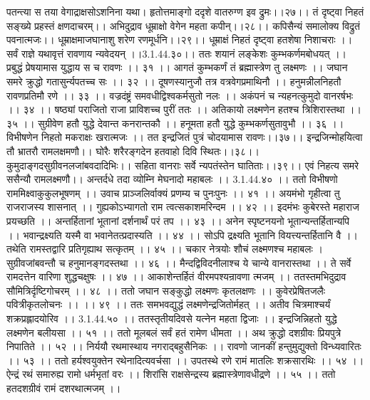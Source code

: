 पतन्त्या स तया वेगाद्राक्षसोऽशनिना यथा।
हृतोत्तमाङ्गो ददृशे वातरुग्ण इव द्रुमः।।२७।।
तं दृष्ट्वा निहतं सङ्ख्ये प्रहस्तं क्षणदाचरम्।।
अभिदुद्राव धूम्राक्षो वेगेन महता कपीन्।।२८।।
कपिसैन्यं समालोक्य विद्रुतं पवनात्मजः।।
धूम्राक्षमाजघानाशु शरेण रणमूर्धनि।।२९।।
धूम्राक्षं निहतं दृष्ट्वा हतशेषा निशाचराः ।।
सर्वं राज्ञे यथावृत्तं रावणाय न्यवेदयन् ।।3.1.44.३०।।
ततः शयानं लङ्केशः कुम्भकर्णमबोधयत् ।।
प्रबुद्धं प्रेषयामास युद्धाय स च रावणः ।। ३१ ।।
आगतं कुम्भकर्णं तं ब्रह्मास्त्रेण तु लक्ष्मणः ।।
जघान समरे क्रुद्धो गतासुर्न्यपतच्च सः ।। ३२ ।।
दूषणस्यानुजौ तत्र वत्रवेगप्रमाथिनौ ।।
हनुमन्नीलनिहतौ रावणप्रतिमौ रणे ।। ३३ ।।
वज्रदंष्ट्रं समवधीद्विश्वकर्मसुतो नलः ।।
अकंपनं च न्यहनत्कुमुदो वानरर्षभः ।। ३४ ।।
षष्ठ्यां पराजितो राजा प्राविशच्च पुरीं ततः ।।
अतिकायो लक्ष्मणेन हतश्च त्रिशिरास्तथा ।। ३५ ।।
सुग्रीवेण हतौ युद्धे देवान्त कनरान्तकौ ।।
हनूमता हतौ युद्धे कुम्भकर्णसुतावुभौ ।। ३६ ।।
विभीषणेन निहतो मकराक्षः खरात्मजः ।।
तत इन्द्रजितं पुत्रं चोदयामास रावणः।।३७।।
इन्द्रजिन्मोहयित्वा तौ भ्रातरौ रामलक्षमणौ।।
घोरैः शरैरङ्गदेन हतवाहो दिवि स्थितः।।३८।।
कुमुदाङ्गदसुग्रीवनलजांबवदादिभिः।।
सहिता वानराः सर्वे न्यपतंस्तेन घातिताः।।३९।।
एवं निहत्य समरे ससैन्यौ रामलक्ष्मणौ।।
अन्तर्दधे तदा व्योम्नि मेघनादो महाबलः ।। 3.1.44.४० ।।
ततो विभीषणो राममिक्ष्वाकुकुलभूषणम् ।।
उवाच प्राञ्जलिर्वाक्यं प्रणम्य च पुनःपुनः ।। ४१ ।।
अयमंभो गृहीत्वा तु राजराजस्य शासनात् ।।
गुह्यकोऽभ्यागतो राम त्वत्सकाशमरिन्दम ।। ४२ ।।
इदमंभः कुबेरस्ते महाराज प्रयच्छति ।।
अन्तर्हितानां भूतानां दर्शनार्थं परं तप ।। ४३ ।।
अनेन स्पृष्टनयनो भूतान्यन्तर्हितान्यपि ।।
भवान्द्रक्ष्यति यस्मै वा भवानेतत्प्रदास्यति ।। ४४ ।।
सोऽपि द्रक्ष्यति भूतानि वियत्त्यन्तर्हितानि वै ।।
तथेति रामस्तद्वारि प्रतिगृह्याथ सत्कृतम् ।। ४५ ।।
चकार नेत्रयोः शौचं लक्ष्मणश्च महाबलः ।
सुग्रीवजांबवन्तौ च हनुमानङ्गदस्तथा ।। ४६ ।।
मैन्दद्विविदनीलाश्च ये चान्ये वानरास्तथा ।।
ते सर्वे रामदत्तेन वारिणा शुद्धचक्षुषः ।। ४७ ।।
आकाशेन्तर्हितं वीरमपश्यन्रावणा त्मजम् ।।
ततस्तमभिदुद्राव सौमित्रिर्दृष्टिगोचरम् ।। ४८ ।।
ततो जघान सङ्कुद्धो लक्ष्मणः कृतलक्षणः ।।
कुवेरप्रेषितजलैः पवित्रीकृतलोचनः ।। ।। ४९ ।।
ततः समभवद्युद्धं लक्ष्मणेन्द्रजितोर्महत् ।।
अतीव चित्रमाश्चर्यं शक्रप्रह्लादयोरिव ।। 3.1.44.५० ।।
ततस्तृतीयदिवसे यत्नेन महता द्विजाः ।।
इन्द्रजिन्निहतो युद्धे लक्ष्मणेन बलीयसा ।। ५१ ।।
ततो मूलबलं सर्वं हतं रामेण धीमता ।।
अथ क्रुद्धो दशग्रीवः प्रियपुत्रे निपातिते ।। ५२ ।।
निर्ययौ रथमास्थाय नगराद्बहुसैनिकः ।।
रावणो जानकीं हन्तुमुद्युक्तो विन्ध्यवारितः ।। ५३ ।।
ततो हर्यश्वयुक्तेन रथेनादित्यवर्चसा ।।
उपतस्थे रणे रामं मातलिः शक्रसारथिः ।। ५४ ।।
ऐन्द्रं रथं समारुह्य रामो धर्मभृतां वरः ।।
शिरांसि राक्षसेन्द्रस्य ब्रह्मास्त्रेणावधीद्रणे ।। ५५ ।।
ततो हतदशग्रीवं रामं दशरथात्मजम् ।।
